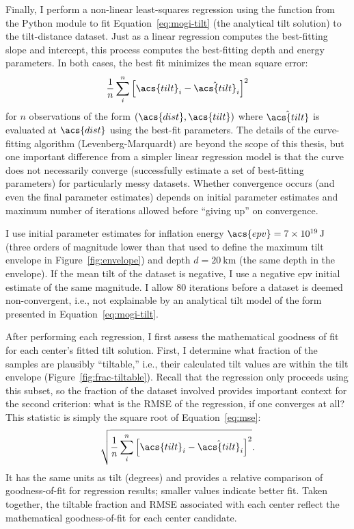 Finally, I perform a non-linear least-squares regression using the  function from the  Python module \parencite{2020SciPy-NMeth} to fit Equation~\eqref{eq:mogi-tilt} (the analytical tilt solution) to the tilt-distance dataset. Just as a linear regression computes the best-fitting slope and intercept, this process computes the best-fitting depth and energy parameters. In both cases, the best fit minimizes the mean square error:
\begin{equation}
    \frac{1}{n}\sum_{i}^{n}{\left[\acs{tilt}_i-\hat{\acs{tilt}}_i\right]}^2\label{eq:mse}
\end{equation}
for $n$ observations of the form $(\acs{dist}, \acs{tilt})$ where $\hat{\acs{tilt}}$ is evaluated at $\acs{dist}$ using the best-fit parameters. The details of the curve-fitting algorithm (Levenberg-Marquardt) are beyond the scope of this thesis, but one important difference from a simpler linear regression model is that the curve does not necessarily converge (successfully estimate a set of best-fitting parameters) for particularly messy datasets. Whether convergence occurs (and even the final parameter estimates) depends on initial parameter estimates and maximum number of iterations allowed before ``giving up'' on convergence.

I use initial parameter estimates for inflation energy $\acs{epv} = \qty{7e19}{\J}$ (three orders of magnitude lower than that used to define the maximum tilt envelope in Figure~\ref{fig:envelope}) and depth $d = \qty{20}{\km}$ (the same depth in the envelope). If the mean tilt of the dataset is negative, I use a negative \acs{epv} initial estimate of the same magnitude. I allow 80 iterations before a dataset is deemed non-convergent, i.e., not explainable by an analytical tilt model of the form presented in Equation~\eqref{eq:mogi-tilt}.

After performing each regression, I first assess the mathematical goodness of fit for each center's fitted tilt solution. First, I determine what fraction of the samples are plausibly ``tiltable,'' i.e., their calculated tilt values are within the tilt envelope (Figure~\ref{fig:frac-tiltable}). Recall that the regression only proceeds using this subset, so the fraction of the dataset involved provides important context for the second criterion: what is the \ac{RMSE} of the regression, if one converges at all? This statistic is simply the square root of Equation~\eqref{eq:mse}:
\begin{equation}
    \sqrt{\frac{1}{n}\sum_{i}^{n}{\left[\acs{tilt}_i-\hat{\acs{tilt}}_i\right]}^2}.\label{eq:rmse}
\end{equation}
It has the same units as \acs{tilt} (degrees) and provides a relative comparison of goodness-of-fit for regression results; smaller values indicate better fit. Taken together, the tiltable fraction and \ac{RMSE} associated with each center reflect the mathematical goodness-of-fit for each center candidate.

